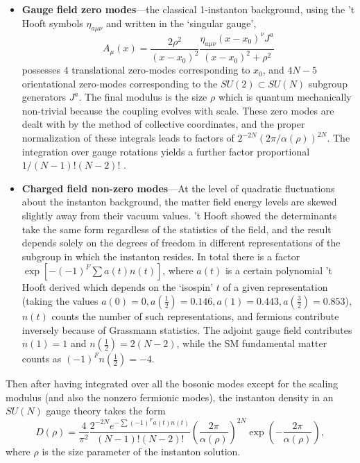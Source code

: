 \documentclass[11pt,a4paper]{article}
\newcommand{\half}{\frac{1}{2}}
\begin{document}
\begin{itemize}
    \item \textbf{Gauge field zero modes}---the classical 1-instanton background, using the 't Hooft symbols $\eta_{a\mu\nu}$ and written in the `singular gauge', 
    \begin{equation}
        A_\mu(x) = \frac{2 \rho^2}{(x-x_0)^2} \frac{\eta_{a\mu\nu} (x-x_0)^\nu J^a}{(x-x_0)^2 + \rho^2}
    \end{equation} 
    possesses $4$ translational zero-modes corresponding to $x_0$, and $4N-5$ orientational zero-modes corresponding to the $SU(2)\subset SU(N)$ subgroup generators $J^a$. The final modulus is the size $\rho$ which is quantum mechanically non-trivial because the coupling evolves with scale. These zero modes are dealt with by the method of collective coordinates, and the proper normalization of these integrals leads to factors of $2^{-2N} (2 \pi/\alpha(\rho))^{2N}$. The integration over gauge rotations yields a further factor proportional $1/(N-1)!(N-2)!$ \cite{Bernard:1979qt}.
    \item \textbf{Charged field non-zero modes}---At the level of quadratic fluctuations about the instanton background, the matter field energy levels are skewed slightly away from their vacuum values. 't Hooft showed the determinants take the same form regardless of the statistics of the field, and the result depends solely on the degrees of freedom in different representations of the subgroup in which the instanton resides. 
    In total there is a factor $\exp\left[-(-1)^F \sum a(t) n(t)\right]$, where $a(t)$ is a certain polynomial 't Hooft derived which depends on the `isospin' $t$ of a given representation (taking the values $a(0) = 0, a(\half)=0.146, a(1)=0.443, a(\frac{3}{2})=0.853$), $n(t)$ counts the number of such representations, and fermions contribute inversely because of Grassmann statistics.
    The adjoint gauge field contributes $n(1) = 1$ and $n(\half) = 2(N-2)$, while the SM fundamental matter counts as $(-1)^F n(\half) = -4$.
\end{itemize}
Then after having integrated over all the bosonic modes except for the scaling modulus (and also the nonzero fermionic modes), the instanton density in an $SU(N)$ gauge theory takes the form 
\begin{equation} \label{eqn:instDens}
    D(\rho) = \frac{4}{\pi^2} \frac{2^{-2N} e^{-\sum (-1)^F a(t) n(t)}}{(N-1)!(N-2)!} \left(\frac{2 \pi}{\alpha(\rho)}\right)^{2N} \exp\left(-\frac{2\pi}{\alpha(\rho)}\right), 
\end{equation}
where $\rho$ is the size parameter of the instanton solution. 
\end{document}
